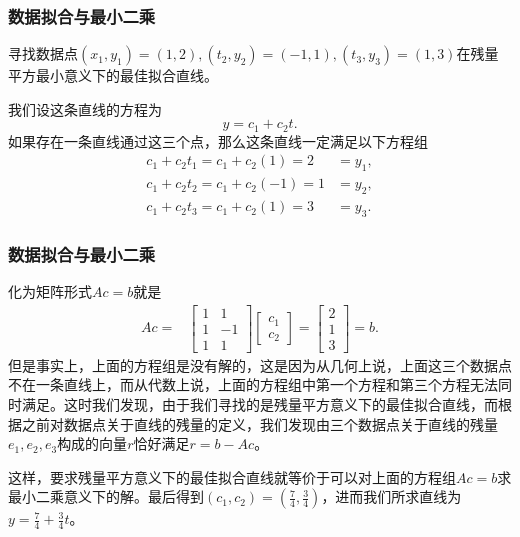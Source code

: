 \documentclass[10pt]{beamer}
\begin{document}
\begin{frame}
\frametitle{数据拟合与最小二乘}
\begin{example}
寻找数据点$(x_1, y_1) = (1,2), (t_2, y_2) = (-1,1), (t_3, y_3) = (1,3)$在残量平方最小意义下的最佳拟合直线。
\end{example}
我们设这条直线的方程为
\begin{equation}
y = c_1 + c_2 t.
\end{equation}
如果存在一条直线通过这三个点，那么这条直线一定满足以下方程组
\begin{align}
c_1 + c_2 t_1 = c_1 + c_2 (1) = 2 &= y_1, \nonumber \\
c_1 + c_2 t_2 = c_1 + c_2 (-1) = 1 &= y_2, \nonumber \\
c_1 + c_2 t_3 = c_1 + c_2 (1) = 3 &= y_3.
\end{align}
\end{frame}


\begin{frame}
\frametitle{数据拟合与最小二乘}
化为矩阵形式$Ac = b$就是
\begin{align}
Ac = &\left[ \begin{array}{cc}
     1    & 1 \\
     1    &   -1 \\
     1    & 1                         
            \end{array} \right] 
\left[ \begin{array}{c} 
      c_1 \\ c_2 \end{array} \right] 
=
\left[ \begin{array}{c}
      2 \\ 1 \\ 3  \end{array} \right] = b.
\end{align}
但是事实上，上面的方程组是没有解的，这是因为从几何上说，上面这三个数据点不在一条直线上，而从代数上说，上面的方程组中第一个方程和第三个方程无法同时满足。这时我们发现，由于我们寻找的是残量平方意义下的最佳拟合直线，而根据之前对数据点关于直线的残量的定义，我们发现由三个数据点关于直线的残量$e_1, e_2, e_3$构成的向量$r$恰好满足$r = b - Ac$。

\vspace{0.2cm}

这样，要求残量平方意义下的最佳拟合直线就等价于可以对上面的方程组$Ac = b$求最小二乘意义下的解。最后得到$(c_1, c_2) = (\frac{7}{4}, \frac{3}{4})$，进而我们所求直线为$y = \frac{7}{4} + \frac{3}{4}t$。
\end{frame}
\end{document}
